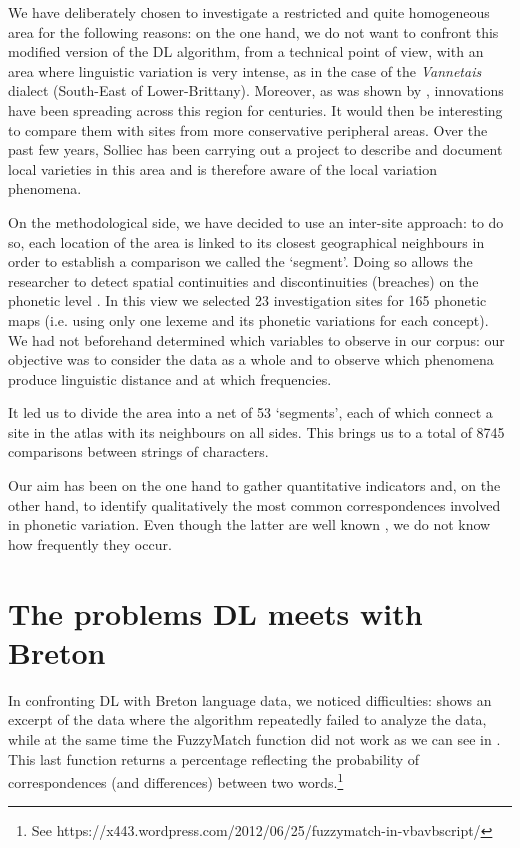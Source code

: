 \documentclass[output=paper]{LSP/langsci}
\begin{document}
We have deliberately chosen to investigate a restricted and quite homogeneous area for the following reasons: on the one hand, we do not want to confront this modified version of the DL algorithm, from a technical point of view, with an area where linguistic variation is very intense, as in the case of the \textit{Vannetais} dialect (South-East of Lower-Brittany). Moreover, as was shown by \citet{falchun_perspectives_1981}, innovations have been spreading across this region for centuries. It would then be interesting to compare them with sites from more conservative peripheral areas. Over the past few years, Solliec has been carrying out a project to describe and document local varieties in this area and is therefore aware of the local variation phenomena.

On the methodological side, we have decided to use an inter-site approach: to do so, each location of the area is linked to its closest geographical neighbours in order to establish a comparison we called the ‘segment’. Doing so allows the researcher to detect spatial continuities and discontinuities (breaches) on the phonetic level \citep[137]{goebl_introduction_2012}. In this view we selected 23 investigation sites for 165 phonetic maps (i.e. using only one lexeme and its phonetic variations for each concept). We had not beforehand determined which variables to observe in our corpus: our objective was to consider the data as a whole and to observe which phenomena produce linguistic distance and at which frequencies.

It led us to divide the area into a net of 53 ‘segments’, each of which connect a site in the atlas with its neighbours on all sides. This brings us to a total of 8745 comparisons between strings of characters.

Our aim has been on the one hand to gather quantitative indicators and, on the other hand, to identify qualitatively the most common correspondences involved in phonetic variation. Even though the latter are well known \citep{falchun_perspectives_1981,jackson_historical_1967}, we do not know how frequently they occur.

\section{The problems DL meets with Breton}

In confronting DL with Breton language data, we noticed difficulties:  shows an excerpt of the data where the algorithm repeatedly failed to analyze the data, while at the same time the FuzzyMatch function did not work as we can see in . This last function returns a percentage reflecting the probability of correspondences (and differences) between two words.\footnote{See  https://x443.wordpress.com/2012/06/25/fuzzymatch-in-vbavbscript/}
\end{document}
